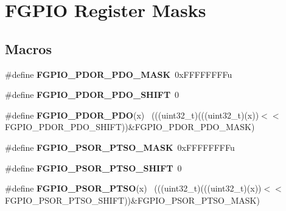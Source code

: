 \hypertarget{group___f_g_p_i_o___register___masks}{}\section{F\+G\+P\+I\+O Register Masks}
\label{group___f_g_p_i_o___register___masks}
\subsection*{Macros}
\begin{DoxyCompactItemize}
\item 
\hypertarget{group___f_g_p_i_o___register___masks_ga36d3575737128f82053b0b713c2ba12c}{}\#define {\bfseries F\+G\+P\+I\+O\+\_\+\+P\+D\+O\+R\+\_\+\+P\+D\+O\+\_\+\+M\+A\+S\+K}~0x\+F\+F\+F\+F\+F\+F\+F\+Fu\label{group___f_g_p_i_o___register___masks_ga36d3575737128f82053b0b713c2ba12c}

\item 
\hypertarget{group___f_g_p_i_o___register___masks_gac47066e363d078fd698fccc3e2717b7e}{}\#define {\bfseries F\+G\+P\+I\+O\+\_\+\+P\+D\+O\+R\+\_\+\+P\+D\+O\+\_\+\+S\+H\+I\+F\+T}~0\label{group___f_g_p_i_o___register___masks_gac47066e363d078fd698fccc3e2717b7e}

\item 
\hypertarget{group___f_g_p_i_o___register___masks_gac8d543e6d04c0067728ca6b835a5df45}{}\#define {\bfseries F\+G\+P\+I\+O\+\_\+\+P\+D\+O\+R\+\_\+\+P\+D\+O}(x)                                            ~(((uint32\+\_\+t)(((uint32\+\_\+t)(x))$<$$<$F\+G\+P\+I\+O\+\_\+\+P\+D\+O\+R\+\_\+\+P\+D\+O\+\_\+\+S\+H\+I\+F\+T))\&F\+G\+P\+I\+O\+\_\+\+P\+D\+O\+R\+\_\+\+P\+D\+O\+\_\+\+M\+A\+S\+K)\label{group___f_g_p_i_o___register___masks_gac8d543e6d04c0067728ca6b835a5df45}

\item 
\hypertarget{group___f_g_p_i_o___register___masks_gae9ca2771800b24b305bfa09312e2ee3e}{}\#define {\bfseries F\+G\+P\+I\+O\+\_\+\+P\+S\+O\+R\+\_\+\+P\+T\+S\+O\+\_\+\+M\+A\+S\+K}~0x\+F\+F\+F\+F\+F\+F\+F\+Fu\label{group___f_g_p_i_o___register___masks_gae9ca2771800b24b305bfa09312e2ee3e}

\item 
\hypertarget{group___f_g_p_i_o___register___masks_ga8a5cd9350700e90d57dfc2d6b27f9184}{}\#define {\bfseries F\+G\+P\+I\+O\+\_\+\+P\+S\+O\+R\+\_\+\+P\+T\+S\+O\+\_\+\+S\+H\+I\+F\+T}~0\label{group___f_g_p_i_o___register___masks_ga8a5cd9350700e90d57dfc2d6b27f9184}

\item 
\hypertarget{group___f_g_p_i_o___register___masks_gafc93f34ccf2780abefde84c2b7063365}{}\#define {\bfseries F\+G\+P\+I\+O\+\_\+\+P\+S\+O\+R\+\_\+\+P\+T\+S\+O}(x)                                          ~(((uint32\+\_\+t)(((uint32\+\_\+t)(x))$<$$<$F\+G\+P\+I\+O\+\_\+\+P\+S\+O\+R\+\_\+\+P\+T\+S\+O\+\_\+\+S\+H\+I\+F\+T))\&F\+G\+P\+I\+O\+\_\+\+P\+S\+O\+R\+\_\+\+P\+T\+S\+O\+\_\+\+M\+A\+S\+K)\label{group___f_g_p_i_o___register___masks_gafc93f34ccf2780abefde84c2b7063365}


\end{DoxyCompactItemize}
